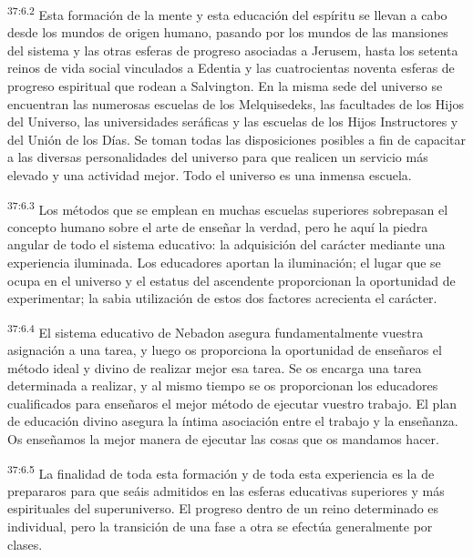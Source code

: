 \par
\textsuperscript{37:6.2} Esta formación de la mente y esta educación del espíritu se llevan a cabo desde los mundos de origen humano, pasando por los mundos de las mansiones del sistema y las otras esferas de progreso asociadas a Jerusem, hasta los setenta reinos de vida social vinculados a Edentia y las cuatrocientas noventa esferas de progreso espiritual que rodean a Salvington. En la misma sede del universo se encuentran las numerosas escuelas de los Melquisedeks, las facultades de los Hijos del Universo, las universidades seráficas y las escuelas de los Hijos Instructores y del Unión de los Días. Se toman todas las disposiciones posibles a fin de capacitar a las diversas personalidades del universo para que realicen un servicio más elevado y una actividad mejor. Todo el universo es una inmensa escuela.

\par
\textsuperscript{37:6.3} Los métodos que se emplean en muchas escuelas superiores sobrepasan el concepto humano sobre el arte de enseñar la verdad, pero he aquí la piedra angular de todo el sistema educativo: la adquisición del carácter mediante una experiencia iluminada. Los educadores aportan la iluminación; el lugar que se ocupa en el universo y el estatus del ascendente proporcionan la oportunidad de experimentar; la sabia utilización de estos dos factores acrecienta el carácter.

\par
\textsuperscript{37:6.4} El sistema educativo de Nebadon asegura fundamentalmente vuestra asignación a una tarea, y luego os proporciona la oportunidad de enseñaros el método ideal y divino de realizar mejor esa tarea. Se os encarga una tarea determinada a realizar, y al mismo tiempo se os proporcionan los educadores cualificados para enseñaros el mejor método de ejecutar vuestro trabajo. El plan de educación divino asegura la íntima asociación entre el trabajo y la enseñanza. Os enseñamos la mejor manera de ejecutar las cosas que os mandamos hacer.

\par
\textsuperscript{37:6.5} La finalidad de toda esta formación y de toda esta experiencia es la de prepararos para que seáis admitidos en las esferas educativas superiores y más espirituales del superuniverso. El progreso dentro de un reino determinado es individual, pero la transición de una fase a otra se efectúa generalmente por clases.


